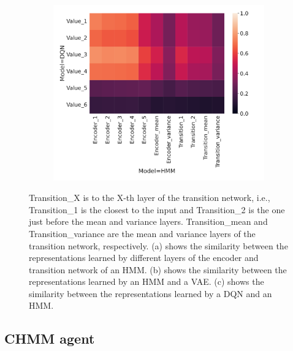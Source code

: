 \documentclass[twoside,11pt]{article}
\begin{document}
\begin{figure}[ht!]
\begin{subfigure}{.3\textwidth}
    \end{subfigure}%
    \begin{subfigure}{.3\textwidth}
        \centering
        \includegraphics[draft=false,width=\linewidth]{cka_figures/CKA_dqn_1_hmm_1}
        \caption{}\label{sfig:cka-hmm-dqn}
    \end{subfigure}
    \caption{Transition\_X is to the X-th layer of the transition network, i.e., Transition\_1 is the closest to the input and Transition\_2 is the one just before the mean and variance layers. Transition\_mean and Transition\_variance are the mean and variance layers of the transition network, respectively. (a) shows the similarity between the representations learned by different layers of the encoder and transition network of an HMM.
        (b) shows the similarity between the representations learned by an HMM and a VAE.
        (c) shows the similarity between the representations learned by a DQN and an HMM.}
    \label{fig:cka-hmm}
\end{figure}

\subsection{CHMM agent} \label{ssec:chmm_results}
\end{document}
